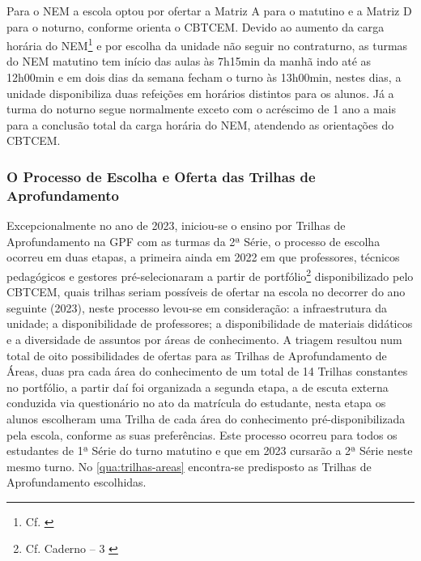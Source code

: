 Para o \ac{NEM} a escola optou por ofertar a Matriz A para o matutino e a Matriz D para o noturno, conforme orienta o \ac{CBTCEM}. Devido ao aumento da carga horária do \ac{NEM}\footnote{Cf. \cite[pp.~53]{BRASIL:2022}} e por escolha da unidade não seguir no contraturno, as turmas do \ac{NEM} matutino tem início das aulas às 7h15min da manhã indo até as 12h00min e em dois dias da semana fecham o turno às 13h00min, nestes dias, a unidade disponibiliza duas refeições em horários distintos para os alunos. Já a turma do noturno segue normalmente exceto com o acréscimo de 1 ano a mais para a conclusão total da carga horária do \ac{NEM}, atendendo as orientações do \ac{CBTCEM}.

\subsubsection{O Processo de Escolha e Oferta das Trilhas de Aprofundamento} %
\label{sec:O Processo de Escolha e Oferta das Trilhas de Aprofundamento}
Excepcionalmente no ano de 2023, iniciou-se o ensino por Trilhas de Aprofundamento na \ac{GPF} com as turmas da 2ª Série, o processo de escolha ocorreu em duas etapas, a primeira ainda em 2022 em que professores, técnicos pedagógicos e gestores pré-selecionaram a partir de portfólio\footnote{Cf. Caderno -- 3 \cite{CATARINA:2021c}} disponibilizado pelo \ac{CBTCEM}, quais trilhas seriam possíveis de ofertar na escola no decorrer do ano seguinte (2023), neste processo levou-se em consideração: a infraestrutura da unidade; a disponibilidade de professores; a disponibilidade de materiais didáticos e a diversidade de assuntos por áreas de conhecimento. A triagem resultou num total de oito possibilidades de ofertas para as Trilhas de Aprofundamento de Áreas, duas pra cada área do conhecimento de um total de 14 Trilhas constantes no portfólio, a partir daí foi organizada a segunda etapa, a de escuta externa conduzida via questionário no ato da matrícula do estudante, nesta etapa os alunos escolheram uma Trilha de cada área do conhecimento pré-disponibilizada pela escola, conforme as suas preferências. Este processo ocorreu para todos os estudantes de 1ª Série do turno matutino e que em 2023 cursarão a 2ª Série neste mesmo turno. No \autoref{qua:trilhas-areas} encontra-se predisposto as Trilhas de Aprofundamento escolhidas.
\vspace{10pt}
